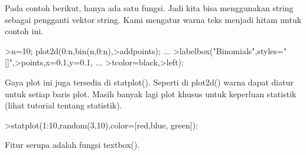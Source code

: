 \documentclass[a4paper,10pt]{article}
\begin{document}
\begin{eulernotebook}
\begin{eulercomment}
\begin{eulercomment}
\begin{eulercomment}
\begin{eulercomment}
\begin{eulercomment}
\begin{eulercomment}
\begin{eulercomment}
Pada contoh berikut, hanya ada satu fungsi. Jadi kita bisa menggunakan
string sebagai pengganti vektor string. Kami mengatur warna teks
menjadi hitam untuk contoh ini.
\end{eulercomment}
\begin{eulerprompt}
>n=10; plot2d(0:n,bin(n,0:n),>addpoints); ...
>labelbox("Binomials",styles="[]",>points,x=0.1,y=0.1, ...
>tcolor=black,>left):
\end{eulerprompt}
\begin{eulercomment}
Gaya plot ini juga tersedia di statplot(). Seperti di plot2d() warna
dapat diatur untuk setiap baris plot. Masih banyak lagi plot khusus
untuk keperluan statistik (lihat tutorial tentang statistik).
\end{eulercomment}
\begin{eulerprompt}
>statplot(1:10,random(3,10),color=[red,blue, green]):
\end{eulerprompt}
\begin{eulercomment}
Fitur serupa adalah fungsi textbox().


\end{eulercomment}
\end{eulercomment}
\end{eulercomment}
\end{eulercomment}
\end{eulercomment}
\end{eulercomment}
\end{eulercomment}
\end{eulernotebook}
\end{document}
